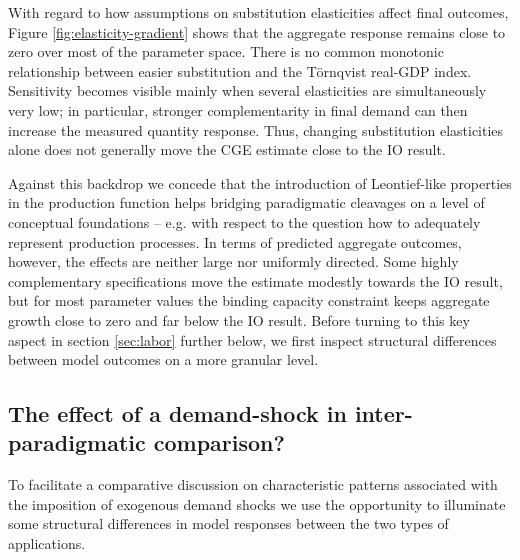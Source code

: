 \documentclass{article}
\begin{document}
With regard to how assumptions on substitution elasticities affect final outcomes, Figure \ref{fig:elasticity-gradient} shows that the aggregate response remains close to zero over most of the parameter space. There is no common monotonic relationship between easier substitution and the T\"ornqvist real-GDP index. Sensitivity becomes visible mainly when several elasticities are simultaneously very low; in particular, stronger complementarity in final demand can then increase the measured quantity response. Thus, changing substitution elasticities alone does not generally move the CGE estimate close to the IO result.

Against this backdrop we concede that the introduction of Leontief-like properties in the production function helps bridging paradigmatic cleavages on a level of conceptual foundations -- e.g. with respect to the question how to adequately represent production processes. In terms of predicted aggregate outcomes, however, the effects are neither large nor uniformly directed. Some highly complementary specifications move the estimate modestly towards the IO result, but for most parameter values the binding capacity constraint keeps aggregate growth close to zero and far below the IO result. Before turning to this key aspect in section \ref{sec:labor} further below, we first inspect structural differences between model outcomes on a more granular level.

\subsection{The effect of a demand-shock in inter-paradigmatic comparison?}

To facilitate a comparative discussion on characteristic patterns associated with the imposition of exogenous demand shocks we use the opportunity to illuminate some structural differences in model responses between the two types of applications.
\end{document}
